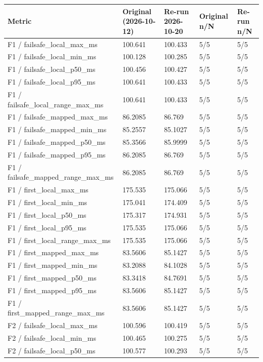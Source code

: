\begin{tabular}{@{}lllll@{}}
\toprule
Metric & Original (2026-10-12) & Re-run 2026-10-20 & Original n/N & Re-run n/N \\
\midrule
F1 / failsafe\_local\_max\_ms & 100.641 & 100.433 & 5/5 & 5/5 \\
F1 / failsafe\_local\_min\_ms & 100.128 & 100.285 & 5/5 & 5/5 \\
F1 / failsafe\_local\_p50\_ms & 100.456 & 100.427 & 5/5 & 5/5 \\
F1 / failsafe\_local\_p95\_ms & 100.641 & 100.433 & 5/5 & 5/5 \\
F1 / failsafe\_local\_range\_max\_ms & 100.641 & 100.433 & 5/5 & 5/5 \\
F1 / failsafe\_mapped\_max\_ms & 86.2085 & 86.769 & 5/5 & 5/5 \\
F1 / failsafe\_mapped\_min\_ms & 85.2557 & 85.1027 & 5/5 & 5/5 \\
F1 / failsafe\_mapped\_p50\_ms & 85.3566 & 85.9999 & 5/5 & 5/5 \\
F1 / failsafe\_mapped\_p95\_ms & 86.2085 & 86.769 & 5/5 & 5/5 \\
F1 / failsafe\_mapped\_range\_max\_ms & 86.2085 & 86.769 & 5/5 & 5/5 \\
F1 / first\_local\_max\_ms & 175.535 & 175.066 & 5/5 & 5/5 \\
F1 / first\_local\_min\_ms & 175.041 & 174.409 & 5/5 & 5/5 \\
F1 / first\_local\_p50\_ms & 175.317 & 174.931 & 5/5 & 5/5 \\
F1 / first\_local\_p95\_ms & 175.535 & 175.066 & 5/5 & 5/5 \\
F1 / first\_local\_range\_max\_ms & 175.535 & 175.066 & 5/5 & 5/5 \\
F1 / first\_mapped\_max\_ms & 83.5606 & 85.1427 & 5/5 & 5/5 \\
F1 / first\_mapped\_min\_ms & 83.2088 & 84.1028 & 5/5 & 5/5 \\
F1 / first\_mapped\_p50\_ms & 83.3418 & 84.7691 & 5/5 & 5/5 \\
F1 / first\_mapped\_p95\_ms & 83.5606 & 85.1427 & 5/5 & 5/5 \\
F1 / first\_mapped\_range\_max\_ms & 83.5606 & 85.1427 & 5/5 & 5/5 \\
F2 / failsafe\_local\_max\_ms & 100.596 & 100.419 & 5/5 & 5/5 \\
F2 / failsafe\_local\_min\_ms & 100.465 & 100.275 & 5/5 & 5/5 \\
F2 / failsafe\_local\_p50\_ms & 100.577 & 100.293 & 5/5 & 5/5 \\

\end{tabular}
